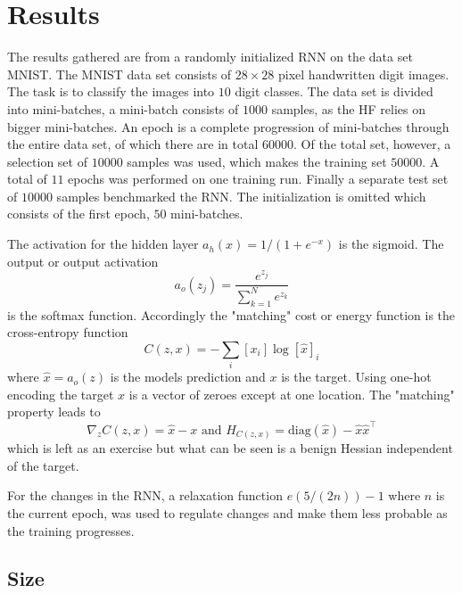 \chapter{Results}

The results gathered are from a randomly initialized RNN on the data set MNIST. The MNIST data set consists of $28 \times 28$ pixel handwritten digit images. The task is to classify the images into $10$ digit classes. The data set is divided into mini-batches, a mini-batch consists of $1000$ samples, as the HF relies on bigger mini-batches. An epoch is a complete progression of mini-batches through the entire data set, of which there are in total $60 000$. Of the total set, however, a selection set of $10 000$ samples was used, which makes the training set $50000$. A total of $11$ epochs was performed on one training run. Finally a separate test set of $10000$ samples benchmarked the RNN. The initialization is omitted which consists of the first epoch, $50$ mini-batches.

The activation for the hidden layer $a_h(x) = 1/(1 + e^{-x})$ is the sigmoid. The output or output activation \[a_o(z_j) = \frac{e^{z_j}}{\sum_{k=1}^N e^{z_k}}\] is the softmax function. Accordingly the "matching" cost or energy function is the cross-entropy function \[C(z,x) = - \sum_i [x_i] \log [\hat{x}]_i\] where $\hat{x} = a_o(z)$ is the models prediction and $x$ is the target. Using one-hot encoding the target $x$ is a vector of zeroes except at one location. The "matching" property leads to \[\nabla_z C(z,x) = \hat{x} - x \text{ and } H_{C(z,x)} = \text{diag}(\hat{x}) - \hat{x} \hat{x}^\top\] which is left as an exercise but what can be seen is a benign Hessian independent of the target. 

For the changes in the RNN, a relaxation function $e(5/(2n)) - 1$ where $n$ is the current epoch, was used to regulate changes and make them less probable as the training progresses.

\section{Size}

\section{}